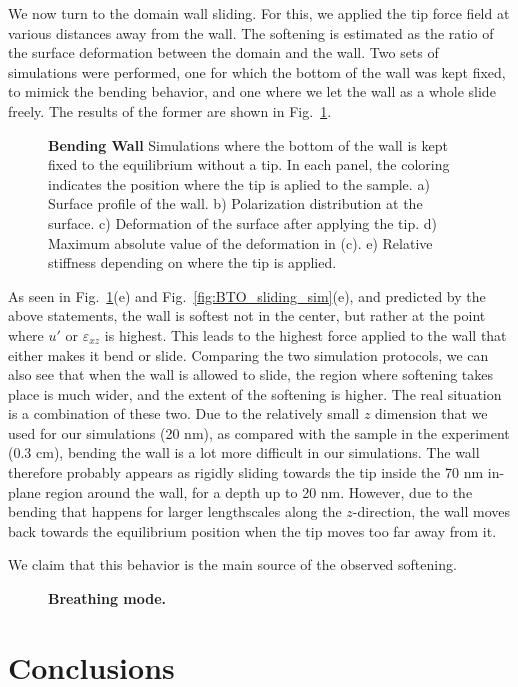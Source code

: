 We now turn to the domain wall sliding.
For this, we applied the tip force field at various distances away from the wall.
The softening is estimated as the ratio of the surface deformation between the domain and the wall.
Two sets of simulations were performed, one for which the bottom of the wall was kept fixed, to mimick the bending behavior, and one where we let the wall as a whole slide freely.
The results of the former are shown in Fig.~\ref{fig:BTO_bending_sim}.
\begin{figure}[h!]
	\caption{\label{fig:BTO_bending_sim}{\bf Bending Wall} Simulations where the bottom of the wall is kept fixed to the equilibrium without a tip. In each panel, the coloring indicates the position where the tip is aplied to the sample. a) Surface profile of the wall. b) Polarization distribution at the surface. c) Deformation of the surface after applying the tip. d) Maximum absolute value of the deformation in (c). e) Relative stiffness depending on where the tip is applied.}
\end{figure}
As seen in Fig.~\ref{fig:BTO_bending_sim}(e) and Fig.~\ref{fig:BTO_sliding_sim}(e), and predicted by the above statements, the wall is softest not in the center, but rather at the point where $u'$ or $\varepsilon_{xz}$ is highest.
This leads to the highest force applied to the wall that either makes it bend or slide.
Comparing the two simulation protocols, we can also see that when the wall is allowed to slide, the region where softening takes place is much wider, and the extent of the softening is higher.
The real situation is a combination of these two. Due to the relatively small $z$ dimension that we used for our simulations (20 nm), as compared with the sample in the experiment (0.3 cm), bending the wall is a lot more difficult in our simulations.
The wall therefore probably appears as rigidly sliding towards the tip inside the 70 nm in-plane region around the wall, for a depth up to 20 nm.
However, due to the bending that happens for larger lengthscales along the $z$-direction, the wall moves back towards the equilibrium position when the tip moves too far away from it.

We claim that this behavior is the main source of the observed softening.


\begin{figure}
	\caption{{\bf Breathing mode.} \label{fig:BTO_breathing}}
\end{figure}
\begin{figure}
	\caption{\label{fig:BTO_theory}}
\end{figure}

\section{Conclusions}


\printbibliography
